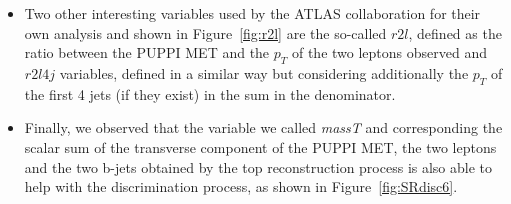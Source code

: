 \documentclass[a4paper, 10pt, openright]{report}
\begin{document}
\begin{itemize}
\item Two other interesting variables used by the \ac{ATLAS} collaboration for their own analysis and shown in Figure~\ref{fig:r2l} are the so-called $r2l$, defined as the ratio between the \ac{PUPPI} \ac{MET} and the $p_T$ of the two leptons observed and $r2l4j$ variables, defined in a similar way but considering additionally the $p_T$ of the first 4 jets (if they exist) in the sum in the denominator.
\item Finally, we observed that the variable we called \textit{massT} and corresponding the scalar sum of the transverse component of the \ac{PUPPI} \ac{MET}, the two leptons and the two b-jets obtained by the top reconstruction process is also able to help with the discrimination process, as shown in Figure~\ref{fig:SRdisc6}.
\begin{figure}[htbp]
\centering
{}


\end{figure}
\end{itemize}
\end{document}
